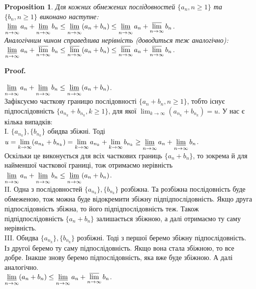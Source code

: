 \documentclass[a4paper, 14pt]{article}
\makeatletter
\def\qed{$\blacksquare$}
\theoremstyle{theoremdd}
\theoremstyle{theoremdd}
\theoremstyle{theoremdd}
\theoremstyle{theoremdd}
\theoremstyle{theoremdd}
\newtheorem{proposition}[theorem]{Proposition}
\theoremstyle{theoremdd}
\theoremstyle{theoremdd}
\theoremstyle{theoremdd}
\renewenvironment{proof}[1][Proof.\\]{\par
\pushQED{\hfill \qed}%
\normalfont \topsep6\p@\@plus6\p@\relax
\trivlist
\item\relax
{\bfseries
#1\@addpunct{.}}\hspace\labelsep\ignorespaces
}{%
\popQED\endtrivlist\@endpefalse
}
\makeatother
\begin{document}
	\begin{proposition}
	Для кожних обмежених послідовностей $\{a_n, n \geq 1 \}$ та $\{b_n, n \geq 1 \}$ виконано наступне:\\
	$\displaystyle\varliminf_{n \to \infty} a_n + \varliminf_{n \to \infty} b_n \leq \varliminf_{n \to \infty} (a_n + b_n) \leq \varliminf_{n \to \infty} a_n + \varlimsup_{n \to \infty} b_n$.\\
	Аналогічним чином справедлива нерівність (доводиться теж аналогічно):\\
	$\displaystyle\varliminf_{n \to \infty} a_n + \varlimsup_{n \to \infty} b_n \leq \varlimsup_{n \to \infty} (a_n + b_n) \leq \varlimsup_{n \to \infty} a_n + \varlimsup_{n \to \infty} b_n$.
	\end{proposition}
	
	\begin{proof}
	$\displaystyle\varliminf_{n \to \infty} a_n + \varliminf_{n \to \infty} b_n \leq \varliminf_{n \to \infty} (a_n + b_n)$.\\
	Зафіксуємо часткову границю послідовності $\{a_n+b_n, n \geq 1\}$, тобто існує підпослідовність $\{a_{n_k} + b_{n_k}, k \geq 1\}$, для якої $\displaystyle\lim_{k \to \infty} (a_{n_k} + b_{n_k}) = u$. У нас є кілька випадків:\\
	I. $\{a_{n_k}\}, \{b_{n_k}\}$ обидва збіжні. Тоді $u = \displaystyle\lim_{k \to \infty} (a_{n_k} + b_{n_k}) = \lim_{k \to \infty} a_{n_k} + \lim_{k \to \infty} b_{n_k} \geq \varliminf_{n \to \infty} a_n + \varliminf_{n \to \infty} b_n$.\\
	Оскільки це виконується для всіх часткових границь $\{a_n+b_n\}$, то зокрема й для найменшої часткової границі, тож отримаємо нерівність  $\displaystyle\varliminf_{n \to \infty} a_n + \varliminf_{n \to \infty} b_n \leq \varliminf_{n \to \infty} (a_n + b_n)$.\\
	II. Одна з послідовностей $\{a_{n_k}\}, \{b_{n_k}\}$ розбіжна. Та розбіжна послідовність буде обмеженою, тож можна буде відокремити збіжну підпідпослідовність. Якщо друга підпослідовність збіжна, то його підпідпослідовність теж. Також підпідпослідовність $\{a_n + b_n\}$ залишається збіжною, а далі отримаємо ту саму нерівність.\\
	III. Обидва $\{a_{n_k}\}, \{b_{n_k}\}$ розбіжні. Тоді з першої беремо збіжну підпослідовність. Із другої беремо ту саму підпослідовність. Якщо вона стала збіжною, то все добре. Інакше знову беремо підпослідовність, яка вже буде збіжною. А далі аналогічно.
	\bigskip \\
	$\displaystyle\varliminf_{n \to \infty} (a_n + b_n) \leq \varliminf_{n \to \infty} a_n + \varlimsup_{n \to \infty} b_n$.\\

\end{proof}
\end{document}
